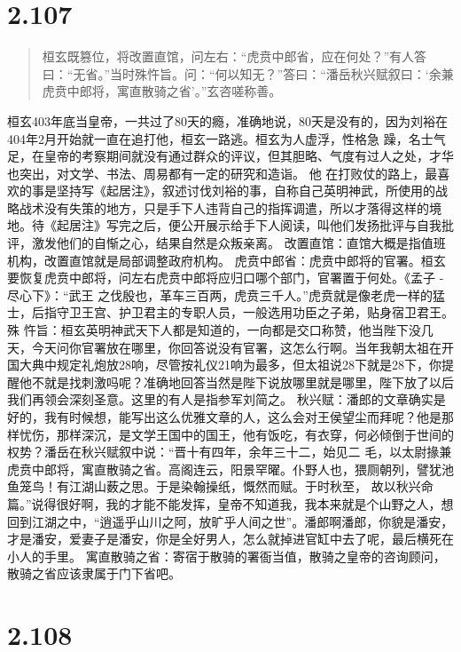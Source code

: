 \documentclass[]{book}
\begin{document}
\section{2.107}\label{section-153}

\begin{quote}
桓玄既篡位，将改置直馆，问左右：``虎贲中郎省，应在何处？''有人答曰：``无省。''当时殊忤旨。问：``何以知无？''答曰：``潘岳秋兴赋叙曰：`余兼虎贲中郎将，寓直散骑之省'。''玄咨嗟称善。
\end{quote}

桓玄403年底当皇帝，一共过了80天的瘾，准确地说，80天是没有的，因为刘裕在404年2月开始就一直在追打他，桓玄一路逃。桓玄为人虚浮，性格急
躁，名士气足，在皇帝的考察期间就没有通过群众的评议，但其胆略、气度有过人之处，才华也突出，对文学、书法、周易都有一定的研究和造诣。
他
在打败仗的路上，最喜欢的事是坚持写《起居注》，叙述讨伐刘裕的事，自称自己英明神武，所使用的战略战术没有失策的地方，只是手下人违背自己的指挥调遣，所以才落得这样的境地。待《起居注》写完之后，便公开展示给手下人阅读，叫他们发扬批评与自我批评，激发他们的自惭之心，结果自然是众叛亲离。
改置直馆：直馆大概是指值班机构，改置直馆就是局部调整政府机构。
虎贲中郎省：虎贲中郎将的官署。桓玄要恢复虎贲中郎将，问左右虎贲中郎将应归口哪个部门，官署置于何处。《孟子
- 尽心下》：``武王
之伐殷也，革车三百两，虎贲三千人。''虎贲就是像老虎一样的猛士，后指守卫王宫、护卫君主的专职人员，一般选用功臣之子弟，贴身宿卫君王。
殊
忤旨：桓玄英明神武天下人都是知道的，一向都是交口称赞，他当陛下没几天，今天问你官署放在哪里，你回答说没有官署，这怎么行啊。当年我朝太祖在开国大典中规定礼炮放28响，尽管按礼仪21响为最多，但太祖说28下就是28下，你提醒他不就是找刺激吗呢？准确地回答当然是陛下说放哪里就是哪里，陛下放了以后我们再领会深刻圣意。这里的有人是指参军刘简之。
秋兴赋：潘郎的文章确实是好的，我有时候想，能写出这么优雅文章的人，这么会对王侯望尘而拜呢？他是那样忧伤，那样深沉，是文学王国中的国王，他有饭吃，有衣穿，何必倾倒于世间的权势？潘岳在秋兴赋叙中说：``晋十有四年，余年三十二，始见二
毛，以太尉掾兼虎贲中郎将，寓直散骑之省。高阁连云，阳景罕曜。仆野人也，猥厕朝列，譬犹池鱼笼鸟！有江湖山薮之思。于是染翰操纸，慨然而赋。于时秋至，
故以秋兴命篇。''说得很好啊，我的才能不能发挥，皇帝不知道我，我本来就是个山野之人，想回到江湖之中，``逍遥乎山川之阿，放旷乎人间之世''。潘郎啊潘郎，你貌是潘安，才是潘安，爱妻子是潘安，你是全好男人，怎么就掉进官缸中去了呢，最后横死在小人的手里。
寓直散骑之省：寄宿于散骑的署衙当值，散骑之皇帝的咨询顾问，散骑之省应该隶属于门下省吧。

\section{2.108}\label{section-154}
\end{document}
